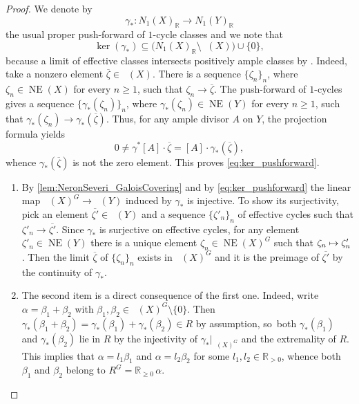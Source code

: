 \documentclass[10pt]{amsart}
\newcommand\mto{\mathchoice{\longmapsto}{\mapsto}{\mapsto}{\mapsto}}
\theoremstyle{plain}
\theoremstyle{definition}
\newcommand{\R}{\mathbb{R}}
\DeclareMathOperator{\NE}{\mathrm{NE}}
\DeclareMathOperator{\NEb}{\overline{\mathrm{NE}}}
\begin{document}
\begin{proof}
We denote by
\[
\gamma_* \colon N_1(X)_\R \to N_1(Y)_\R
\]
the usual proper push-forward of $1$\nobreakdash-cycle classes and we note that
\begin{equation}
\label{eq:ker_pushforward}
\ker (\gamma_*) \subseteq \bigl(N_1(X)_\R \setminus \NEb(X) \bigr) \cup \{ 0 \},
\end{equation}
because a limit of effective classes intersects positively ample classes by \cite[Th.\,1.44]{KM98}. Indeed, take a nonzero element $\overline{\zeta} \in \NEb(X)$. There is a sequence $\{\zeta_n\}_n$, where $\zeta_n \in \NE(X)$ for every $n \geq 1$, such that $ \zeta_n \to \overline{\zeta}$. The push-forward of $1$\nobreakdash-cycles gives a sequence $\bigl\{ \gamma_*(\zeta_n) \bigr\}_n$, where $\gamma_* (\zeta_n) \in \NE(Y)$ for every $n \geq 1$, such that $\gamma_*(\zeta_n) \to \gamma_*(\overline{\zeta})$. Thus, for any ample divisor $A$ on $Y$, the projection formula yields
\[
0\neq \gamma^*[A]\cdot \overline{\zeta}=[A]\cdot \gamma_*(\overline{\zeta}),
\]
whence $\gamma_*(\overline{\zeta})$ is not the zero element. This proves \eqref{eq:ker_pushforward}.

\begin{enumerate}
\item
By \autoref{lem:NeronSeveri_GaloisCovering} and by \eqref{eq:ker_pushforward} the linear map $\NEb(X)^G\to \NEb(Y)$ induced by $\gamma_*$ is injective. To show its surjectivity, pick an element $\overline{\zeta'} \in \NEb(Y)$ and a sequence $\{\zeta'_n\}_n$ of effective cycles such that $\zeta'_n \to \overline{\zeta'}$. Since $\gamma_*$ is surjective on effective cycles, for any element $\zeta'_n \in \NE(Y)$ there is a unique element $\zeta_n\in \NE(X)^G$ such that $\zeta_n \mto \zeta_n'$.
Then the limit $\overline{\zeta}$ of $\{\zeta_n\}_n$ exists in $\NEb(X)^G$ and it is the preimage of $\overline{\zeta'}$ by the continuity of $\gamma_*$.

\item
The second item is a direct consequence of the first one. Indeed, write $\alpha = \beta_1 + \beta_2$ with $\beta_1, \beta_2 \in \NEb(X)^G \setminus \{0\}$. Then $\gamma_*(\beta_1 + \beta_2)=\gamma_*(\beta_1) + \gamma_*(\beta_2) \in R$ by assumption, so~both $\gamma_*(\beta_1)$ and $ \gamma_*(\beta_2)$ lie in $R$ by the injectivity of $\gamma_* |_{\NEb(X)^G}$ and the extremality of $R$. This implies that $\alpha=l_1 \beta_1$ and $\alpha=l_2 \beta_2$ for some $l_1, l_2 \in \R_{>0}$, whence both $\beta_1$ and $\beta_2$ belong to $R^G = \R_{\geq 0} \,\alpha$.


\end{enumerate}
\end{proof}
\end{document}
